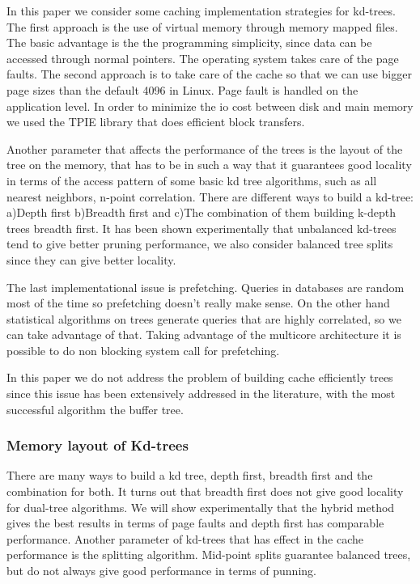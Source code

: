 \documentclass[12pt,letterpaper,doublespaced,ETD,dvips,proposal]{gtthesis}
\begin{document}
\begin{Body}
In this paper we consider some caching implementation strategies for
kd-trees. The first approach is the use of virtual memory through
memory mapped files. The basic advantage is the the programming
simplicity, since data can be accessed through normal pointers. The
operating system takes care of the page faults. The second approach
is to take care of the cache so that we can use bigger page sizes
than the default 4096 in Linux. Page fault is handled on the
application level. In order to minimize the io cost between disk and
main memory we used the TPIE library that does efficient block
transfers.

Another parameter that affects the performance of the trees is the
layout of the tree on the memory, that has to be in such a way that
it guarantees good locality in terms of the access pattern of some
basic kd tree algorithms, such as all  nearest neighbors, n-point
correlation. There are different ways to build a kd-tree: a)Depth
first b)Breadth first and c)The combination of them building k-depth
trees breadth first. It has been shown experimentally that
unbalanced kd-trees tend to give better pruning performance, we also
consider balanced tree splits since they can give better locality.

The last implementational issue is prefetching.  Queries in
databases are random most of the time so prefetching doesn't really
make sense. On the other hand statistical algorithms on trees
generate queries that are highly correlated, so we can take
advantage of that. Taking advantage of the multicore architecture it
is possible to do non blocking system call for prefetching.

In this paper we do not address the problem of building cache
efficiently trees since this issue has been extensively addressed in
the literature, with the most successful algorithm the buffer tree.

\subsubsection{Memory layout of Kd-trees} There are many ways to
build a kd tree, depth first, breadth first and the combination for
both. It turns out that breadth first does not give good locality
for dual-tree algorithms. We will show experimentally that the
hybrid method gives the best results in terms of page faults and
depth first has comparable performance. Another parameter of
kd-trees that has effect in the cache performance is the splitting
algorithm. Mid-point splits  guarantee balanced trees, but do not
always give good performance in terms of punning.


\end{Body}
\end{document}

